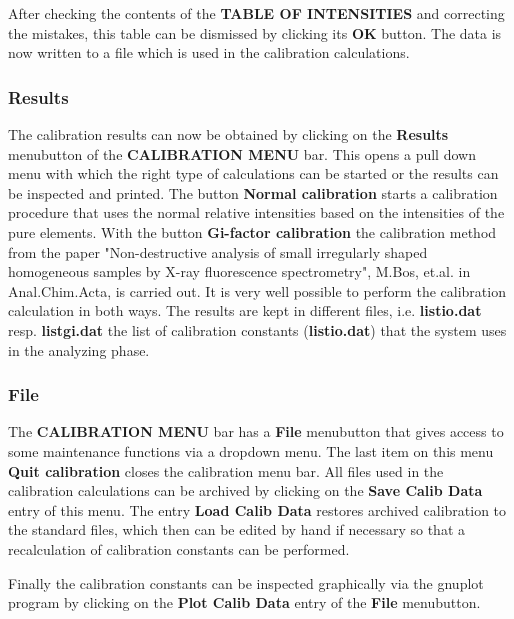 After checking the contents of the {\bf TABLE OF INTENSITIES} and
correcting the mistakes, this table can be dismissed by clicking 
its {\bf OK} button. The data is now written to a file which is used
in the calibration calculations.

\subsubsection{Results}
The calibration results can now be obtained by clicking on 
the {\bf Results} menubutton of the {\bf CALIBRATION MENU} bar.
This opens a pull down menu with which the right type of calculations
 can be started or  the
results can be inspected and printed. The button {\bf Normal calibration}
starts a calibration procedure that uses the normal relative intensities
based on the intensities of the pure elements. With the button
{\bf Gi-factor calibration} the calibration method from the paper
"Non-destructive analysis of small irregularly shaped homogeneous
samples by X-ray fluorescence spectrometry", M.Bos, et.al. in
Anal.Chim.Acta, is carried out. It is very well possible
to perform the calibration calculation in both ways. The results
are kept in different files, i.e. {\bf listio.dat} resp. {\bf listgi.dat}
the list of calibration constants ({\bf listio.dat}) that the
system uses in the analyzing phase.

\subsubsection{File}
The {\bf CALIBRATION MENU} bar has a {\bf File} menubutton that gives
access to some maintenance functions via a dropdown menu.
The last item on this menu {\bf Quit calibration} closes the calibration
menu bar. All files used in the calibration calculations can be archived
by clicking on the {\bf Save Calib Data} entry of this menu.
The entry {\bf Load Calib Data} restores archived calibration
to the standard files, which then can be edited by hand if necessary
so that a recalculation of calibration constants can be performed.

Finally the calibration constants can be inspected graphically
via the gnuplot program by clicking on the {\bf Plot Calib Data} entry
of the {\bf File} menubutton.

